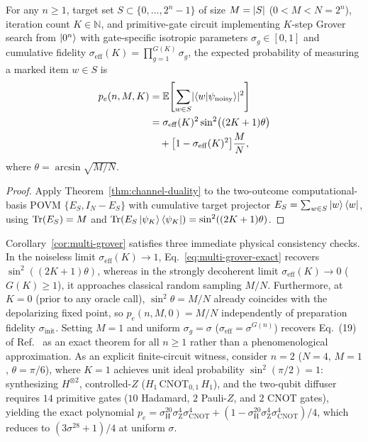 \begin{corollary}
\label{cor:multi-grover}
For any $n \ge 1$, target set $S \subset \{0, \dots, 2^n - 1\}$ of size $M = \lvert S\rvert$ ($0 < M < N = 2^n$), iteration count $K \in \mathbb{N}$, and primitive-gate circuit implementing $K$-step Grover search from $\ket{0^n}$ with gate-specific isotropic parameters $\sigma_g \in [0, 1]$ and cumulative fidelity $\sigma_{\mathrm{eff}}(K) = \prod_{g=1}^{G(K)} \sigma_g$, the expected probability of measuring a marked item $w \in S$ is
\begin{align}
p_e(n, M, K) &= \mathbb{E}\Biggl[\sum_{w \in S} \lvert\braket{w | \psi_{\mathrm{noisy}}}\rvert^2\Biggr] \nonumber \\
&= \sigma_{\mathrm{eff}}(K)^2 \sin^2\bigl((2K + 1)\theta\bigr) \nonumber \\
&\quad + \bigl[1 - \sigma_{\mathrm{eff}}(K)^2\bigr]\frac{M}{N},
\label{eq:multi-grover-exact}
\end{align}
where $\theta = \arcsin\sqrt{M/N}$.
\end{corollary}

\begin{proof}
Apply Theorem~\ref{thm:channel-duality} to the two-outcome computational-basis POVM $\{E_S, I_N - E_S\}$ with cumulative target projector $E_S = \sum_{w \in S}\ket{w}\bra{w}$, using $\operatorname{Tr}(E_S) = M$ and $\operatorname{Tr}(E_S \ket{\psi_K}\bra{\psi_K}) = \sin^2((2K + 1)\theta)$.
\end{proof}

Corollary~\ref{cor:multi-grover} satisfies three immediate physical consistency checks. In the noiseless limit $\sigma_{\mathrm{eff}}(K) \to 1$, Eq.~\eqref{eq:multi-grover-exact} recovers $\sin^2((2K + 1)\theta)$, whereas in the strongly decoherent limit $\sigma_{\mathrm{eff}}(K) \to 0$ ($G(K) \ge 1$), it approaches classical random sampling $M/N$. Furthermore, at $K = 0$ (prior to any oracle call), $\sin^2\theta = M/N$ already coincides with the depolarizing fixed point, so $p_e(n, M, 0) = M/N$ independently of preparation fidelity $\sigma_{\mathrm{init}}$. Setting $M = 1$ and uniform $\sigma_g = \sigma$ ($\sigma_{\mathrm{eff}} = \sigma^{G(n)}$) recovers Eq.~(19) of Ref.~\cite{SahaRoyLacalle2026} as an exact theorem for all $n \ge 1$ rather than a phenomenological approximation. As an explicit finite-circuit witness, consider $n = 2$ ($N = 4$, $M = 1$, $\theta = \pi/6$), where $K = 1$ achieves unit ideal probability $\sin^2(\pi/2) = 1$: synthesizing $H^{\otimes 2}$, controlled-$Z$ ($H_1\,\mathrm{CNOT}_{0,1}\,H_1$), and the two-qubit diffuser requires $14$ primitive gates ($10$ Hadamard, $2$ Pauli-$Z$, and $2$ $\mathrm{CNOT}$ gates), yielding the exact polynomial $p_e = \sigma_{\mathrm{H}}^{20}\sigma_{\mathrm{Z}}^4\sigma_{\mathrm{CNOT}}^4 + (1 - \sigma_{\mathrm{H}}^{20}\sigma_{\mathrm{Z}}^4\sigma_{\mathrm{CNOT}}^4)/4$, which reduces to $(3\sigma^{28} + 1)/4$ at uniform $\sigma$.

